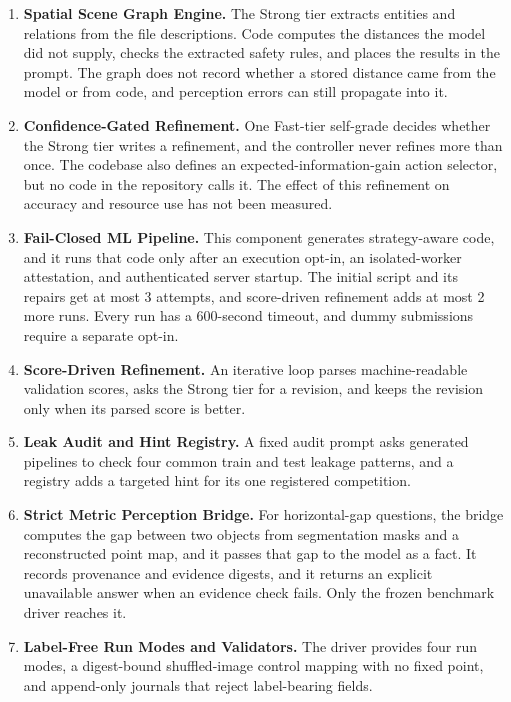 \documentclass{article}
\begin{document}
\begin{enumerate}[leftmargin=*,nosep]
  \item \textbf{Spatial Scene Graph Engine.} The Strong tier extracts entities and relations from the file descriptions. Code computes the distances the model did not supply, checks the extracted safety rules, and places the results in the prompt. The graph does not record whether a stored distance came from the model or from code, and perception errors can still propagate into it.
  \item \textbf{Confidence-Gated Refinement.} One Fast-tier self-grade decides whether the Strong tier writes a refinement, and the controller never refines more than once. The codebase also defines an expected-information-gain action selector, but no code in the repository calls it. The effect of this refinement on accuracy and resource use has not been measured.
  \item \textbf{Fail-Closed ML Pipeline.} This component generates strategy-aware code, and it runs that code only after an execution opt-in, an isolated-worker attestation, and authenticated server startup. The initial script and its repairs get at most 3 attempts, and score-driven refinement adds at most 2 more runs. Every run has a 600-second timeout, and dummy submissions require a separate opt-in.
  \item \textbf{Score-Driven Refinement.} An iterative loop parses machine-readable validation scores, asks the Strong tier for a revision, and keeps the revision only when its parsed score is better.
  \item \textbf{Leak Audit and Hint Registry.} A fixed audit prompt asks generated pipelines to check four common train and test leakage patterns, and a registry adds a targeted hint for its one registered competition.
  \item \textbf{Strict Metric Perception Bridge.} For horizontal-gap questions, the bridge computes the gap between two objects from segmentation masks and a reconstructed point map, and it passes that gap to the model as a fact. It records provenance and evidence digests, and it returns an explicit unavailable answer when an evidence check fails. Only the frozen benchmark driver reaches it.
  \item \textbf{Label-Free Run Modes and Validators.} The driver provides four run modes, a digest-bound shuffled-image control mapping with no fixed point, and append-only journals that reject label-bearing fields.
\end{enumerate}
\end{document}
